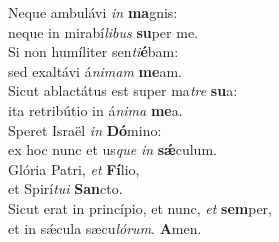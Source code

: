 \evenverse Neque ambulávi \textit{in} \textbf{ma}gnis:~\*\\
\evenverse neque in mirabí\textit{li}\textit{bus} \textbf{su}per me.\\
\oddverse Si non humíliter sen\textit{ti}\textbf{é}bam:~\*\\
\oddverse sed exaltávi á\textit{ni}\textit{mam} \textbf{me}am.\\
\evenverse Sicut ablactátus est super ma\textit{tre} \textbf{su}a:~\*\\
\evenverse ita retribútio in á\textit{ni}\textit{ma} \textbf{me}a.\\
\oddverse Speret Israël \textit{in} \textbf{Dó}mino:~\*\\
\oddverse ex hoc nunc et us\textit{que} \textit{in} \textbf{sǽ}culum.\\
\evenverse Glória Patri, \textit{et} \textbf{Fí}lio,~\*\\
\evenverse et Spirí\textit{tu}\textit{i} \textbf{San}cto.\\
\oddverse Sicut erat in princípio, et nunc, \textit{et} \textbf{sem}per,~\*\\
\oddverse et in sǽcula sæcu\textit{ló}\textit{rum}. \textbf{A}men.\\
